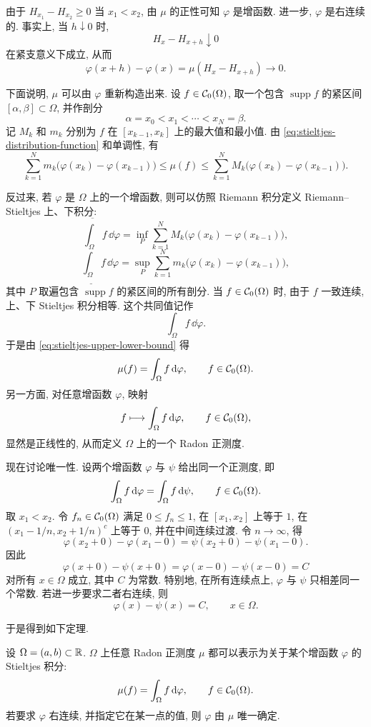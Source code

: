 由于 \(H_{x_1}-H_{x_2}\geq0\) 当 \(x_1<x_2\), 由 \(\mu\) 的正性可知 \(\varphi\) 是增函数. 进一步, \(\varphi\) 是右连续的. 事实上, 当 \(h\downarrow0\) 时,
\[
H_x-H_{x+h}\downarrow0
\]
在紧支意义下成立, 从而
\[
\varphi(x+h)-\varphi(x)
=
\mu(H_x-H_{x+h})\longrightarrow0.
\]

下面说明, \(\mu\) 可以由 \(\varphi\) 重新构造出来. 设 \(f\in\mathcal{C}_0(\Omega)\), 取一个包含 \(\operatorname{supp}f\) 的紧区间 \([\alpha,\beta]\subset\Omega\), 并作剖分
\[
\alpha=x_0<x_1<\cdots <x_N=\beta.
\]
记 \(M_k\) 和 \(m_k\) 分别为 \(f\) 在 \([x_{k-1},x_k]\) 上的最大值和最小值. 由 \eqref{eq:stieltjes-distribution-function} 和单调性, 有
\begin{equation}
	\sum_{k=1}^N m_k\bigl(\varphi(x_k)-\varphi(x_{k-1})\bigr)
	\leq
	\mu(f)
	\leq
	\sum_{k=1}^N M_k\bigl(\varphi(x_k)-\varphi(x_{k-1})\bigr).
	\label{eq:stieltjes-upper-lower-bound}
\end{equation}

反过来, 若 \(\varphi\) 是 \(\Omega\) 上的一个增函数, 则可以仿照 Riemann 积分定义 Riemann--Stieltjes 上、下积分:
\[
\overline{\int_\Omega} f\,\dd\varphi
=
\inf_P\sum_{k=1}^N M_k\bigl(\varphi(x_k)-\varphi(x_{k-1})\bigr),
\]
\[
\underline{\int_\Omega} f\,\dd\varphi
=
\sup_P\sum_{k=1}^N m_k\bigl(\varphi(x_k)-\varphi(x_{k-1})\bigr),
\]
其中 \(P\) 取遍包含 \(\operatorname{supp}f\) 的紧区间的所有剖分. 当 \(f\in\mathcal{C}_0(\Omega)\) 时, 由于 \(f\) 一致连续, 上、下 Stieltjes 积分相等. 这个共同值记作
\[
\int_\Omega f\,\dd\varphi.
\]
于是由 \eqref{eq:stieltjes-upper-lower-bound} 得
\[
\mu(f)=\int_\Omega f\,\dd\varphi,
\qquad f\in\mathcal{C}_0(\Omega).
\]
另一方面, 对任意增函数 \(\varphi\), 映射
\[
f\longmapsto \int_\Omega f\,\dd\varphi,
\qquad f\in\mathcal{C}_0(\Omega),
\]
显然是正线性的, 从而定义 \(\Omega\) 上的一个 Radon 正测度.

现在讨论唯一性. 设两个增函数 \(\varphi\) 与 \(\psi\) 给出同一个正测度, 即
\[
\int_\Omega f\,\dd\varphi
=
\int_\Omega f\,\dd\psi,
\qquad f\in\mathcal{C}_0(\Omega).
\]
取 \(x_1<x_2\). 令 \(f_n\in\mathcal{C}_0(\Omega)\) 满足 \(0\leq f_n\leq1\), 在 \([x_1,x_2]\) 上等于 \(1\), 在 \((x_1-1/n,x_2+1/n)^c\) 上等于 \(0\), 并在中间连续过渡. 令 \(n\to\infty\), 得
\[
\varphi(x_2+0)-\varphi(x_1-0)
=
\psi(x_2+0)-\psi(x_1-0).
\]
因此
\[
\varphi(x+0)-\psi(x+0)
=
\varphi(x-0)-\psi(x-0)=C
\]
对所有 \(x\in\Omega\) 成立, 其中 \(C\) 为常数. 特别地, 在所有连续点上, \(\varphi\) 与 \(\psi\) 只相差同一个常数. 若进一步要求二者右连续, 则
\[
\varphi(x)-\psi(x)=C,
\qquad x\in\Omega.
\]

于是得到如下定理.

\begin{thm}
	\label{thm:one-dimensional-positive-measure-stieltjes}
	设 \(\Omega=(a,b)\subset\mathbb{R}\). \(\Omega\) 上任意 Radon 正测度 \(\mu\) 都可以表示为关于某个增函数 \(\varphi\) 的 Stieltjes 积分:
	\[
	\mu(f)=\int_\Omega f\,\dd\varphi,
	\qquad f\in\mathcal{C}_0(\Omega).
	\]
	若要求 \(\varphi\) 右连续, 并指定它在某一点的值, 则 \(\varphi\) 由 \(\mu\) 唯一确定.
\end{thm}

